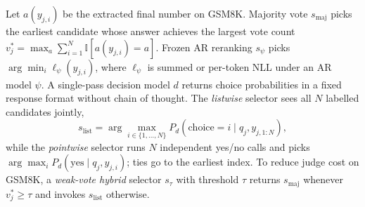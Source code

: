 Let $a(y_{j,i})$ be the extracted final number on GSM8K. Majority vote $s_{\mathrm{maj}}$ picks the earliest candidate whose answer achieves the largest vote count $v_j^\ast=\max_a \sum_{i=1}^N \mathbb{I}[a(y_{j,i})=a]$. Frozen AR reranking $s_\psi$ picks $\arg\min_i \ell_\psi(y_{j,i})$, where $\ell_\psi$ is summed or per-token NLL under an AR model $\psi$. A single-pass decision model $d$ returns choice probabilities in a fixed response format without chain of thought. The \emph{listwise} selector sees all $N$ labelled candidates jointly,
\begin{equation}
s_{\mathrm{list}}=\arg\max_{i\in\{1,\dots,N\}} P_d(\text{choice}=i \mid q_j, y_{j,1:N}),
\end{equation}
while the \emph{pointwise} selector runs $N$ independent yes/no calls and picks $\arg\max_i P_d(\text{yes}\mid q_j, y_{j,i})$; ties go to the earliest index. To reduce judge cost on GSM8K, a \emph{weak-vote hybrid} selector $s_\tau$ with threshold $\tau$ returns $s_{\mathrm{maj}}$ whenever $v_j^\ast \ge \tau$ and invokes $s_{\mathrm{list}}$ otherwise.

